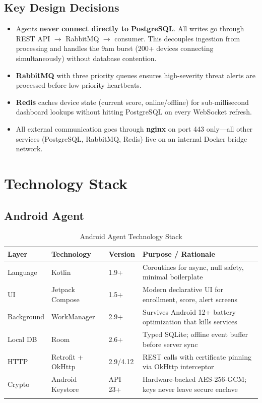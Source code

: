 \documentclass[12pt,a4paper]{report}
\begin{document}
\section{Key Design Decisions}

\begin{itemize}[leftmargin=*, noitemsep]
  \item Agents \textbf{never connect directly to PostgreSQL}. All writes go through REST API $\rightarrow$ RabbitMQ $\rightarrow$ consumer. This decouples ingestion from processing and handles the 9am burst (200+ devices connecting simultaneously) without database contention.

  \item \textbf{RabbitMQ} with three priority queues ensures high-severity threat alerts are processed before low-priority heartbeats.

  \item \textbf{Redis} caches device state (current score, online/offline) for sub-millisecond dashboard lookups without hitting PostgreSQL on every WebSocket refresh.

  \item All external communication goes through \textbf{nginx} on port 443 only—all other services (PostgreSQL, RabbitMQ, Redis) live on an internal Docker bridge network.
\end{itemize}

\chapter{Technology Stack}

\section{Android Agent}

\begin{longtable}{@{}p{2.5cm}p{3cm}p{2cm}p{6cm}@{}}
  \toprule
  \textbf{Layer} & \textbf{Technology} & \textbf{Version} & \textbf{Purpose / Rationale} \\
  \midrule
  \endhead
  Language    & Kotlin          & 1.9+      & Coroutines for async, null safety, minimal boilerplate \\
  UI          & Jetpack Compose & 1.5+      & Modern declarative UI for enrollment, score, alert screens \\
  Background  & WorkManager     & 2.9+      & Survives Android 12+ battery optimization that kills services \\
  Local DB    & Room            & 2.6+      & Typed SQLite; offline event buffer before server sync \\
  HTTP        & Retrofit + OkHttp & 2.9/4.12 & REST calls with certificate pinning via OkHttp interceptor \\
  Crypto      & Android Keystore & API 23+  & Hardware-backed AES-256-GCM; keys never leave secure enclave \\
  \bottomrule
  \caption{Android Agent Technology Stack}
\end{longtable}
\end{document}

